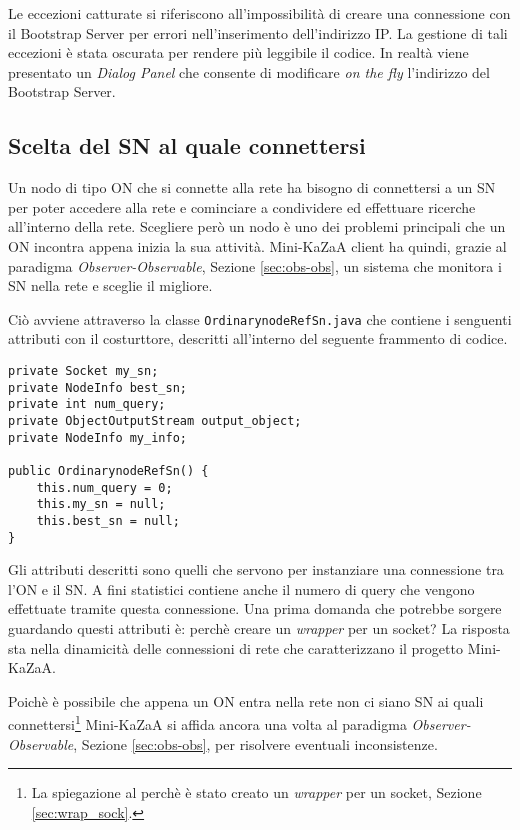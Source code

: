Le eccezioni catturate si riferiscono all'impossibilità di creare una connessione con il Bootstrap Server per errori nell'inserimento dell'indirizzo IP.
La gestione di tali eccezioni è stata oscurata per rendere più leggibile il codice.
In realtà viene presentato un \emph{Dialog Panel} che consente di modificare \emph{on the fly} l'indirizzo del Bootstrap Server.

\subsection{Scelta del SN al quale connettersi}\label{sec:scelta_sn}
Un nodo di tipo ON che si connette alla rete ha bisogno di connettersi a un SN per poter accedere alla rete e cominciare a condividere ed effettuare ricerche all'interno della rete.
Scegliere però un nodo è uno dei problemi principali che un ON incontra appena inizia la sua attività.
Mini-KaZaA client ha quindi, grazie al paradigma \emph{Observer-Observable}, Sezione \ref{sec:obs-obs}, un sistema che monitora i SN nella rete
e sceglie il migliore.

Ciò avviene attraverso la classe \verb|OrdinarynodeRefSn.java| che contiene i senguenti attributi con il costurttore, descritti all'interno del
seguente frammento di codice.
\begin{lstlisting}
private Socket my_sn;
private NodeInfo best_sn;
private int num_query;
private ObjectOutputStream output_object;
private NodeInfo my_info;

public OrdinarynodeRefSn() {
	this.num_query = 0;
	this.my_sn = null;
	this.best_sn = null;
}
\end{lstlisting}
Gli attributi descritti sono quelli che servono per instanziare una connessione tra l'ON e il SN.
A fini statistici contiene anche il numero di query che vengono effettuate tramite questa connessione.
Una prima domanda che potrebbe sorgere guardando questi attributi è: perchè creare un \emph{wrapper} per un socket?
La risposta sta nella dinamicità delle connessioni di rete che caratterizzano il progetto Mini-KaZaA.

Poichè è possibile che appena un ON entra nella rete non ci siano SN ai quali connettersi\footnote{La spiegazione al perchè è stato creato un \emph{wrapper} per un socket, Sezione \ref{sec:wrap_sock}.} Mini-KaZaA si affida ancora una volta al paradigma \emph{Observer-Observable}, Sezione \ref{sec:obs-obs}, per risolvere eventuali inconsistenze.

